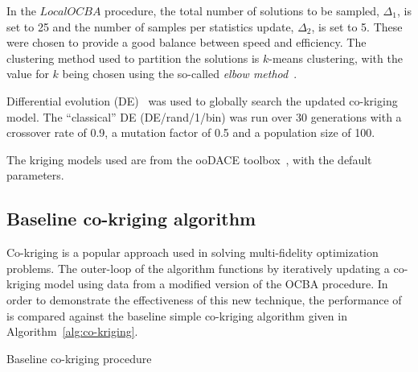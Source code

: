 In the $LocalOCBA$ procedure, the total number of solutions to be sampled, $\Delta_1$, is set to 25 and the number of samples per statistics update, $\Delta_2$, is set to 5. These were chosen to provide a good balance between speed and efficiency. The clustering method used to partition the solutions is $k$-means clustering, with the value for $k$ being chosen using the so-called \emph{elbow method}~\cite{leonard1990finding}.

Differential evolution (DE)~\cite{storn1997differential} was used to globally search the updated co-kriging model. The ``classical'' DE (DE/rand/1/bin) was run over 30 generations with a crossover rate of 0.9, a mutation factor of 0.5 and a population size of 100.

The kriging models used are from the ooDACE toolbox~\cite{oodace}, with the default parameters.

\subsection{Baseline co-kriging algorithm}
Co-kriging is a popular approach used in solving multi-fidelity optimization problems. The outer-loop of the \AlgName{} algorithm functions by iteratively updating a co-kriging model using data from a modified version of the OCBA procedure. In order to demonstrate the effectiveness of this new technique, the performance of \AlgName{} is compared against the baseline simple co-kriging algorithm given in Algorithm~\ref{alg:co-kriging}.


\begin{algorithm}[h!] 
\caption{Baseline co-kriging procedure}
\label{alg:co-kriging}
{\footnotesize
\begin{algorithmic}[1]
 
  
   
     
  \ENDIF
   
   
   
   
   
\ENDWHILE
\end{algorithmic}
}
\end{algorithm}

